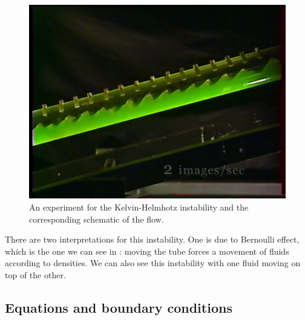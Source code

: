 \documentclass[palatino]{epflnotes}
\begin{document}
\begin{figure}[hbtp]
\centering
\begin{minipage}{0.45\textwidth}
\includegraphics[width = \textwidth]{img/HolmboeTube.png}
\end{minipage}
\hfill
\begin{minipage}{0.45\textwidth}
\end{minipage}
\caption{An experiment for the Kelvin-Helmhotz instability and the corresponding schematic of the flow.}
\label{fig:KelvinHelmholtz}
\end{figure}

There are two interpretations for this instability. One is due to Bernoulli effect, which is the one we can see in : moving the tube forces a movement of fluids according to densities. We can also see this instability with one fluid moving on top of the other.

\subsection{Equations and boundary conditions}
\end{document}
